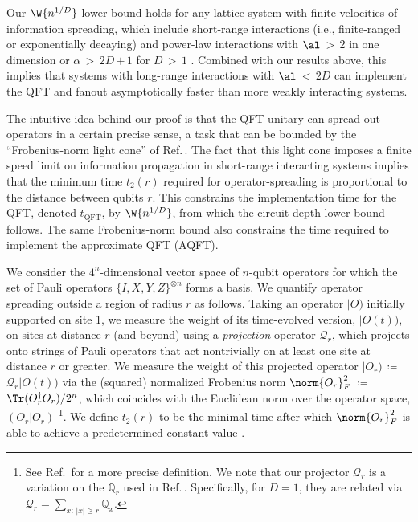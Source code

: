Our $\W {n^{1/D}}$ lower bound holds for any lattice system with finite velocities of information spreading, which include short-range interactions (i.e., finite-ranged or exponentially decaying) and power-law interactions with $\al$\,$>$\,$2$ in one dimension or $\alpha$\,$>$\,$2D$\,$+$\,$1$ for $D$\,$>$\,$1$ \cite{Lieb1972,Chen2019,kuwaharaStrictlyLinearLight2020}.
Combined with our results above, this implies that systems with long-range interactions with $\al$\,$<$\,$2D$ can implement the QFT and fanout asymptotically faster than more weakly interacting systems.

The intuitive idea behind our proof is that the QFT unitary can spread out operators in a certain precise sense, a task that can be bounded by the ``Frobenius-norm light cone'' of Ref.\,\cite{Tran2020hierarchylinearlightcones}.
The fact that this light cone imposes a finite speed limit on information propagation in short-range interacting systems implies that the minimum time $t_2(r)$ required for operator-spreading is proportional to the distance between qubits $r$.
This constrains the implementation time for the QFT, denoted $t_\mathrm{QFT}$, by $\W {n^{1/D}}$, from which the circuit-depth lower bound follows.
The same Frobenius-norm bound also constrains the time required to implement the approximate QFT (AQFT).

We consider the $4^n$-dimensional vector space of $n$-qubit operators for which the set of Pauli operators $\{I,X,Y,Z\}^{\otimes n}$ forms a basis.
We quantify operator spreading outside a region of radius $r$ as follows.
Taking an operator $|O)$ initially supported on site 1, we measure the weight of its time-evolved version, $|O(t))$, on sites at distance $r$ (and beyond) using a \emph{projection} operator $\mathcal{Q}_{r}$, which projects onto strings of Pauli operators that act nontrivially on at least one site at distance $r$ or greater.
We measure the weight of this projected operator $|O_r)$\,$\coloneqq$\,$\mathcal{Q}_{r}|O(t))$ via the (squared) normalized Frobenius norm $\norm{O_r}_F^2$\,$\coloneqq$\,$\Tr(O_r^\dag O_r)/2^n$, which coincides with the Euclidean norm over the operator space, $(O_r|O_r)$ \footnote{See Ref.\,\cite{Tran2020} for a more precise definition.
    We note that our projector $\mathcal{Q}_r$ is a variation on the $\mathbb{Q}_r$ used in {Ref.\,\cite{Tran2020}}.
    Specifically, for $D=1$, they are related via $\mathcal{Q}_r = \sum_{x:\,|x|\ge r} \mathbb{Q}_x$.}.
We define $t_2(r)$ to be the minimal time after which $\norm{O_r}_F^2$ is able to achieve a predetermined constant value \cite{Tran2020hierarchylinearlightcones}.

